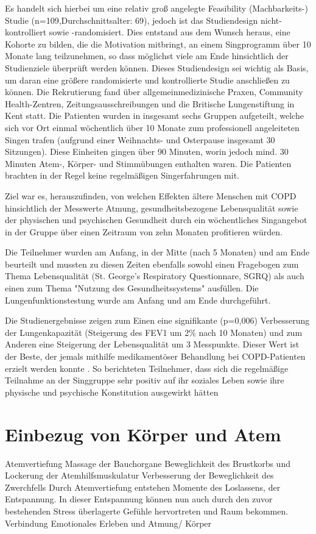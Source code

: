 Es handelt sich hierbei um eine relativ groß angelegte Feasibility (Machbarkeits-) Studie (n=109,Durchschnittsalter: 69), jedoch ist das Studiendesign nicht-kontrolliert sowie -randomisiert. Dies entstand aus dem Wunsch heraus, eine Kohorte zu bilden, die die Motivation mitbringt, an einem Singprogramm über 10 Monate lang teilzunehmen, so dass möglichst viele am Ende hinsichtlich der Studienziele überprüft werden können. Dieses Studiendesign sei wichtig als Basis, um daran eine größere randomisierte und kontrollierte Studie anschließen zu können. Die Rekrutierung fand über allgemeinmedizinische Praxen, Community Health-Zentren, Zeitungsausschreibungen und die Britische Lungenstiftung in Kent statt. Die Patienten wurden in insgesamt sechs Gruppen aufgeteilt, welche sich vor Ort einmal wöchentlich über 10 Monate zum professionell angeleiteten Singen trafen (aufgrund einer Weihnachts- und Osterpause insgesamt 30 Sitzungen). Diese Einheiten gingen über 90 Minuten, worin jedoch mind. 30 Minuten Atem-, Körper- und Stimmübungen enthalten waren. Die Patienten brachten in der Regel keine regelmäßigen Singerfahrungen mit.

Ziel war es, herauszufinden, von welchen Effekten ältere Menschen mit COPD hinsichtlich der Messwerte Atmung, gesundheitsbezogene Lebensqualität sowie der physischen und psychischen Gesundheit durch ein wöchentliches Singangebot in der Gruppe über einen Zeitraum von zehn Monaten profitieren würden. 

Die Teilnehmer wurden am Anfang, in der Mitte (nach 5 Monaten) und am Ende beurteilt und mussten zu diesen Zeiten ebenfalls sowohl einen Fragebogen zum Thema Lebensqualität (St. George's Respiratory Questionnare, SGRQ) als auch einen zum Thema "Nutzung des Gesundheitssystems" ausfüllen. Die Lungenfunktionstestung wurde am Anfang und am Ende durchgeführt. 

Die Studienergebnisse zeigen zum Einen eine signifikante (p=0,006) Verbesserung der Lungenkapazität (Steigerung des FEV1 um 2\% nach 10 Monaten) und zum Anderen eine Steigerung der Lebensqualität um 3 Messpunkte. Dieser Wert ist der Beste, der jemals mithilfe medikamentöser Behandlung bei COPD-Patienten erzielt werden konnte \autocite[vgl.]{clift2013a}. So berichteten Teilnehmer, dass sich die regelmäßige Teilnahme an der Singgruppe sehr positiv auf ihr soziales Leben sowie ihre physische und psychische Konstitution ausgewirkt hätten \autocite[vgl.][6ff.]{clift2013}

\section{Einbezug von Körper und Atem} 
\label{section:einbezug von koerper und atem}
Atemvertiefung
Massage der Bauchorgane
Beweglichkeit des Brustkorbs und Lockerung der Atemhilfsmuskulatur
Verbesserung der Beweglichkeit des Zwerchfells
Durch Atemvertiefung entstehen Momente des Loslassens, der Entspannung. In dieser Entspannung können nun auch durch den zuvor bestehenden Stress überlagerte Gefühle hervortreten und Raum bekommen. 
Verbindung Emotionales Erleben und Atmung/ Körper




